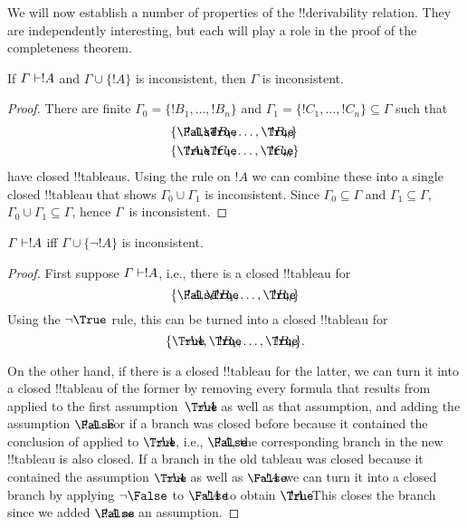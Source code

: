 \documentclass[../../../include/open-logic-section]{subfiles}
\begin{document}
      {}
      {}


We will now establish a number of properties of the !!{derivability}
relation.  They are independently interesting, but each will play a
role in the proof of the completeness theorem.

\begin{prop}
  If $\Gamma \Proves !A$ and $\Gamma \cup \{!A\}$ is
  inconsistent, then $\Gamma$ is inconsistent.
\end{prop}

\begin{proof}
There are finite $\Gamma_0 = \{!B_1, \dots, !B_n\}$ and $\Gamma_1
  =\{!C_1, \dots, !C_n\} \subseteq \Gamma$ such that
  \begin{align*}
    \{\sFmla{\False}{!A}, &
    \sFmla{\True}{!B_1}, \dots, \sFmla{\True}{!B_n}\} \\
    \{\sFmla{\True}{!A}, &
    \sFmla{\True}{!C_1}, \dots, \sFmla{\True}{!C_m}\}
  \end{align*}
  have closed !!{tableau}s.  Using the \Cut{} rule on $!A$ we can
  combine these into a single closed !!{tableau} that shows $\Gamma_0
  \cup \Gamma_1$ is inconsistent.  Since $\Gamma_0
  \subseteq \Gamma$ and $\Gamma_1 \subseteq \Gamma$, $\Gamma_0 \cup
  \Gamma_1 \subseteq \Gamma$, hence $\Gamma$~is inconsistent.
\end{proof}

\begin{prop}
$\Gamma \Proves !A$ iff $\Gamma \cup \{\lnot !A\}$ is inconsistent.
\end{prop}

\begin{proof}
First suppose $\Gamma \Proves !A$, i.e., there is
a closed !!{tableau} for
\[
\{\sFmla{\False}{!A},
\sFmla{\True}{!B_1}, \dots, \sFmla{\True}{!B_n}\}
\]
Using the $\TRule{\True}{\lnot}$ rule, this can be turned into a
closed !!{tableau} for
\[
\{\sFmla{\True}{\lnot !A},
\sFmla{\True}{!B_1}, \dots, \sFmla{\True}{!B_n}\}.
\]

On the other hand, if there is a closed !!{tableau} for the latter, we
can turn it into a closed !!{tableau} of the former by removing every
formula that results from \TRule{\True}{\lnot} applied to the first
assumption~$\sFmla{\True}{\lnot !A}$ as well as that assumption, and
adding the assumption $\sFmla{\False}{!A}$. For if a branch was closed
before because it contained the conclusion of \TRule{\True}{\lnot}
applied to $\sFmla{\True}{\lnot !A}$, i.e., $\sFmla{\False}{!A}$, the
corresponding branch in the new !!{tableau} is also closed. If a
branch in the old tableau was closed because it contained the
assumption $\sFmla{\True}{\lnot !A}$ as well as $\sFmla{\False}{\lnot
  !A}$ we can turn it into a closed branch by applying
$\TRule{\False}{\lnot}$ to $\sFmla{\False}{\lnot !A}$ to obtain
$\sFmla{\True}{!A}$. This closes the branch since we added
$\sFmla{\False}{!A}$ as an assumption.
\end{proof}
\end{document}
